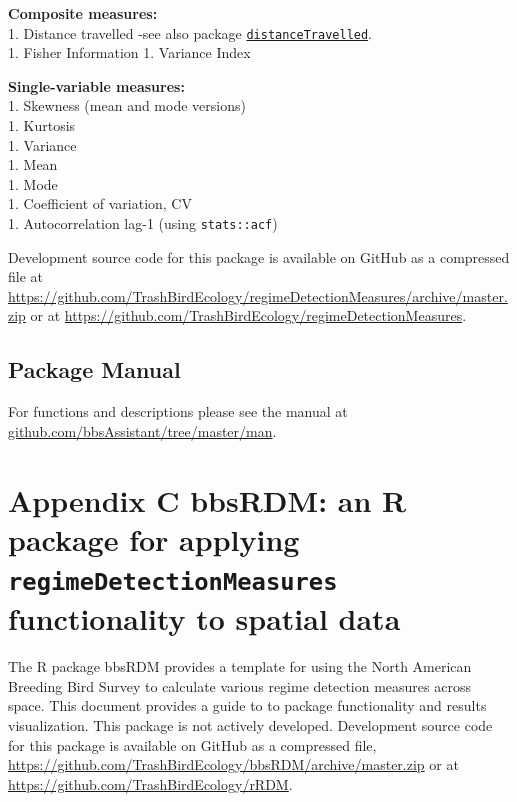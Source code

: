 \documentclass[print]{nuthesis}
\begin{document}
\textbf{Composite measures:}\\
1. Distance travelled -see also package \href{https://github.com/TrashBirdEcology/distanceTravelled}{\texttt{distanceTravelled}}.\\
1. Fisher Information
1. Variance Index

\textbf{Single-variable measures:}\\
1. Skewness (mean and mode versions)\\
1. Kurtosis\\
1. Variance\\
1. Mean\\
1. Mode\\
1. Coefficient of variation, CV\\
1. Autocorrelation lag-1 (using \texttt{stats::acf})

Development source code for this package is available on GitHub as a compressed file at \url{https://github.com/TrashBirdEcology/regimeDetectionMeasures/archive/master.zip} or at \url{https://github.com/TrashBirdEcology/regimeDetectionMeasures}.

\hypertarget{package-manual-1}{%
\section{Package Manual}\label{package-manual-1}}

For functions and descriptions please see the manual at \href{https://github.com/TrashBirdEcology/bbsAssistant/tree/master/man}{github.com/bbsAssistant/tree/master/man}.

\hypertarget{bbsRDM}{%
\chapter*{\texorpdfstring{Appendix C bbsRDM: an R package for applying \texttt{regimeDetectionMeasures} functionality to spatial data}{Appendix C bbsRDM: an R package for applying regimeDetectionMeasures functionality to spatial data}}\label{bbsRDM}}

The R package bbsRDM provides a template for using the North American Breeding Bird Survey to calculate various regime detection measures across space. This document provides a guide to to package functionality and results visualization. This package is not actively developed. Development source code for this package is available on GitHub as a compressed file, \url{https://github.com/TrashBirdEcology/bbsRDM/archive/master.zip} or at \url{https://github.com/TrashBirdEcology/rRDM}.
\end{document}
